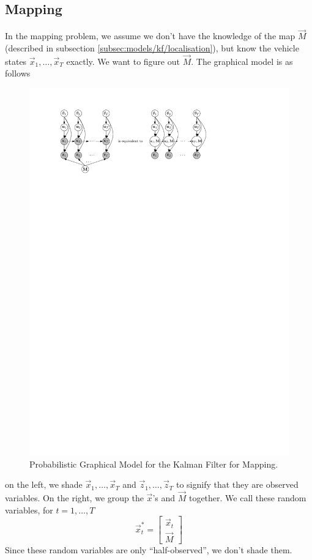 \subsection{Mapping}
In the mapping problem, we assume we don't have the knowledge of the map $\vec M$ (described in subsection \ref{subsec:models/kf/localisation}), but know the vehicle states $\vec x_1, \dotsc, \vec x_T$ exactly. We want to figure out $\vec M$. The graphical model is as follows
\begin{figure}[!htb]
\centering
\includegraphics[scale=1]{models/kf/figures/kf-map}
\caption{Probabilistic Graphical Model for the Kalman Filter for Mapping.}
\label{fig:models/kf/figures/kf-map}
\end{figure}

on the left, we shade $\vec x_1, \dotsc, \vec x_T$ and $\vec z_1, \dotsc, \vec z_T$ to signify that they are observed variables. On the right, we group the $\vec x$'s and $\vec M$ together. We call these random variables, for $t = 1, \dotsc, T$
\begin{equation}
	\vec x_t^\ast =
		\begin{bmatrix}
			\vec x_t \\
			\vec M
		\end{bmatrix}
\end{equation}
Since these random variables are only ``half-observed'', we don't shade them.

